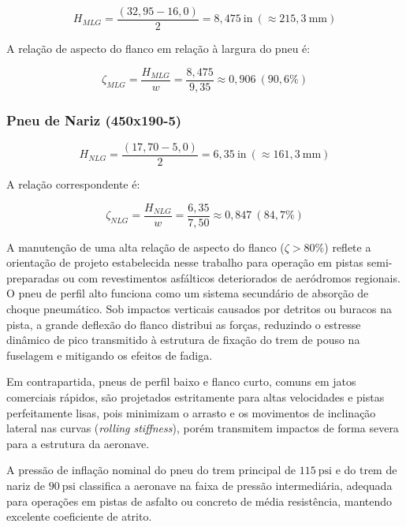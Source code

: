\begin{equation}
H_{MLG} = \frac{(32,95 - 16,0)}{2} = 8,475 \ \text{in} \ (\approx 215,3 \ \text{mm})
\end{equation}

A relação de aspecto do flanco em relação à largura do pneu é:

\begin{equation}
\zeta_{MLG} = \frac{H_{MLG}}{w} = \frac{8,475}{9,35} \approx 0,906 \ (90,6\%)
\end{equation}

\subsubsection*{Pneu de Nariz (450x190-5)}

\begin{equation}
H_{NLG} = \frac{(17,70 - 5,0)}{2} = 6,35 \ \text{in} \ (\approx 161,3 \ \text{mm})
\end{equation}

A relação correspondente é:

\begin{equation}
\zeta_{NLG} = \frac{H_{NLG}}{w} = \frac{6,35}{7,50} \approx 0,847 \ (84,7\%)
\end{equation}

A manutenção de uma alta relação de aspecto do flanco ($\zeta > 80\%$) reflete a orientação de projeto estabelecida nesse trabalho para operação em pistas semi-preparadas ou com revestimentos asfálticos deteriorados de aeródromos regionais. O pneu de perfil alto funciona como um sistema secundário de absorção de choque pneumático. Sob impactos verticais causados por detritos ou buracos na pista, a grande deflexão do flanco distribui as forças, reduzindo o estresse dinâmico de pico transmitido à estrutura de fixação do trem de pouso na fuselagem e mitigando os efeitos de fadiga.

Em contrapartida, pneus de perfil baixo e flanco curto, comuns em jatos comerciais rápidos, são projetados estritamente para altas velocidades e pistas perfeitamente lisas, pois minimizam o arrasto e os movimentos de inclinação lateral nas curvas (\textit{rolling stiffness}), porém transmitem impactos de forma severa para a estrutura da aeronave.

A pressão de inflação nominal do pneu do trem principal de $115 \ \text{psi}$ e do trem de nariz de $90 \ \text{psi}$ classifica a aeronave na faixa de pressão intermediária, adequada para operações em pistas de asfalto ou concreto de média resistência, mantendo excelente coeficiente de atrito.


